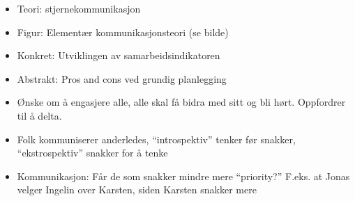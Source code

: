 \begin{itemize}
\item Teori: stjernekommunikasjon
\item Figur: Elementær kommunikasjonsteori (se bilde)
\item Konkret: Utviklingen av samarbeidsindikatoren
\item Abstrakt: Pros and cons ved grundig planlegging
\item Ønske om å engasjere alle, alle skal få bidra med sitt og bli hørt. Oppfordrer til å delta.
\item Folk kommuniserer anderledes, “introspektiv” tenker før snakker, “ekstrospektiv” snakker for å tenke
\item Kommunikasjon: Får de som snakker mindre mere “priority?” F.eks. at Jonas velger Ingelin over Karsten, siden Karsten snakker mere
\end{itemize}